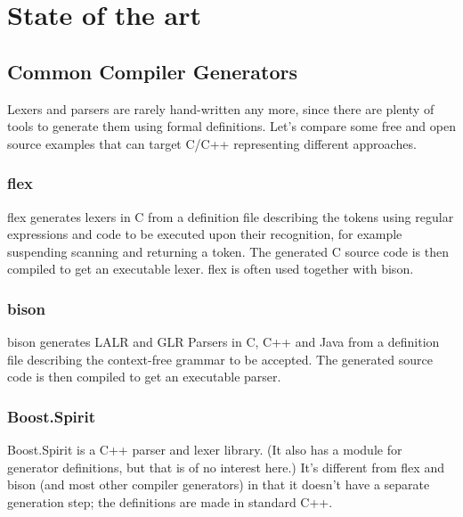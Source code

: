 
\chapter{State of the art}
        
        
	\section{Common Compiler Generators}
    	
		Lexers and parsers are rarely hand-written any more, since there are plenty of tools to generate them using formal definitions. Let's compare some free and open source examples that can target C/C++ representing different approaches.
		
		\subsection{flex}
		
			flex\cite{flex} generates lexers in C from a definition file describing the tokens using regular expressions and code to be executed upon their recognition, for example suspending scanning and returning a token. The generated C source code is then compiled to get an executable lexer. flex is often used together with bison.
			
		
		\subsection{bison}
			
			bison\cite{bison} generates LALR and GLR Parsers in C, C++ and Java from a definition file describing the context-free grammar to be accepted. The generated source code is then compiled to get an executable parser.
		
		\subsection{Boost.Spirit}
			
			Boost.Spirit\cite{spirit} is a C++ parser and lexer library. (It also has a module for generator definitions, but that is of no interest here.) It's different from flex and bison (and most other compiler generators) in that it doesn't have a separate generation step; the definitions are made in standard C++.
			
